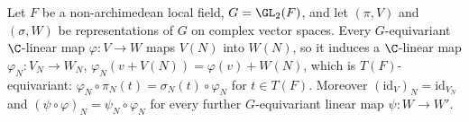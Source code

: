 Let $F$ be a non-archimedean local field, $G=\GL_2(F)$, and let $(\pi,V)$ and $(\sigma,W)$ be representations of $G$ on
complex vector spaces. Every $G$-equivariant $\C$-linear map $\varphi\colon V\to W$ maps $V(N)$ into $W(N)$, so it
induces a $\C$-linear map $\varphi_N\colon V_N\to W_N$, $\varphi_N(v+V(N))=\varphi(v)+W(N)$, which is
$T(F)$-equivariant: $\varphi_N\circ\pi_N(t)=\sigma_N(t)\circ\varphi_N$ for $t\in T(F)$. Moreover
$(\mathrm{id}_V)_N=\mathrm{id}_{V_N}$ and $(\psi\circ\varphi)_N=\psi_N\circ\varphi_N$ for every further $G$-equivariant
linear map $\psi\colon W\to W'$.
